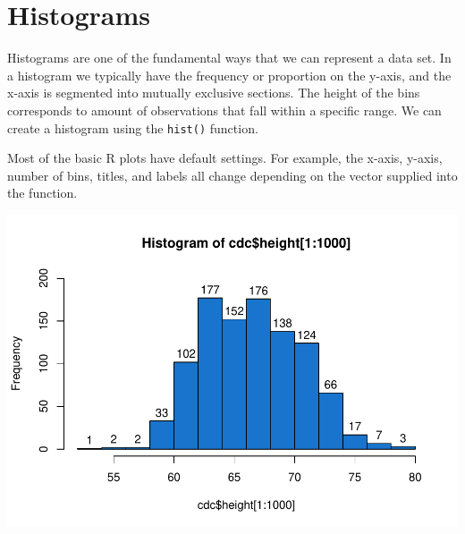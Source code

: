 \documentclass[
]{book}
\newenvironment{Shaded}{\begin{snugshade}}{\end{snugshade}}
\newcommand{\CommentTok}[1]{\textcolor[rgb]{0.56,0.35,0.01}{\textit{#1}}}
\newcommand{\DataTypeTok}[1]{\textcolor[rgb]{0.13,0.29,0.53}{#1}}
\newcommand{\KeywordTok}[1]{\textcolor[rgb]{0.13,0.29,0.53}{\textbf{#1}}}
\newcommand{\NormalTok}[1]{#1}
\newcommand{\OperatorTok}[1]{\textcolor[rgb]{0.81,0.36,0.00}{\textbf{#1}}}
\newcommand{\StringTok}[1]{\textcolor[rgb]{0.31,0.60,0.02}{#1}}
\begin{document}
\hypertarget{histograms}{%
\section{Histograms}\label{histograms}}

Histograms are one of the fundamental ways that we can represent a data set. In a histogram we typically have the frequency or proportion on the y-axis, and the x-axis is segmented into mutually exclusive sections. The height of the bins corresponds to amount of observations that fall within a specific range. We can create a histogram using the \texttt{hist()} function.

Most of the basic R plots have default settings. For example, the x-axis, y-axis, number of bins, titles, and labels all change depending on the vector supplied into the function.

\begin{Shaded}
\end{Shaded}

\includegraphics{_main_files/figure-latex/unnamed-chunk-223-1.pdf}

\begin{Shaded}
\end{Shaded}
\end{document}
